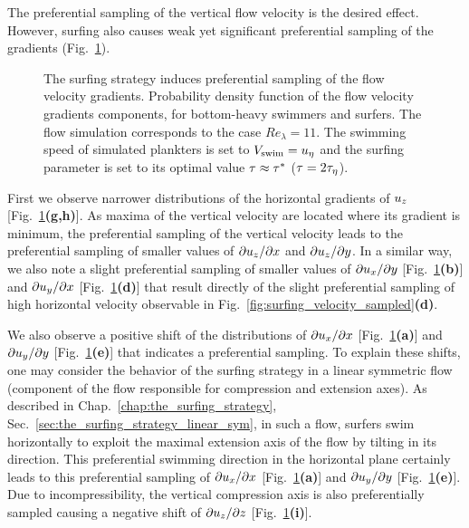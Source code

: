 The preferential sampling of the vertical flow velocity is the desired effect. 
However, surfing also causes weak yet significant preferential sampling of the gradients (Fig.~\ref{fig:surfing_gradient_sampled}).
\begin{figure}[t]
	\centering
	
	\caption[The surfing strategy induces preferential sampling of the flow velocity gradients.]{
		The surfing strategy induces preferential sampling of the flow velocity gradients.
		Probability density function of the flow velocity gradients components, for bottom-heavy swimmers and surfers. 
		The flow simulation corresponds to the case $\mathit{Re}_{\lambda} = 11$. The swimming speed of simulated plankters is set to $V_{\mathrm{swim}} = u_{\eta}$ and the surfing parameter is set to its optimal value $\tau \approx \tau^*$ ($\tau = 2 \tau_{\eta}$).
	}
	\label{fig:surfing_gradient_sampled}
\end{figure}
First we observe narrower distributions of the horizontal gradients of $u_{z}$ [Fig.~\ref{fig:surfing_gradient_sampled}\textbf{(g,h)}]. 
As maxima of the vertical velocity are located where its gradient is minimum, the preferential sampling of the vertical velocity leads to the preferential sampling of smaller values of $\partial u_z/\partial x$ and $\partial u_z/\partial y$.
In a similar way, we also note a slight preferential sampling of smaller values of $\partial u_x/\partial y$ [Fig.~\ref{fig:surfing_gradient_sampled}\textbf{(b)}] and $\partial u_y/\partial x$ [Fig.~\ref{fig:surfing_gradient_sampled}\textbf{(d)}] that result directly of the slight preferential sampling of high horizontal velocity observable in Fig.~\ref{fig:surfing_velocity_sampled}\textbf{(d)}.

We also observe a positive shift of the distributions of $\partial u_x/\partial x$ [Fig.~\ref{fig:surfing_gradient_sampled}\textbf{(a)}] and $\partial u_y/\partial y$ [Fig.~\ref{fig:surfing_gradient_sampled}\textbf{(e)}] that indicates a preferential sampling.
To explain these shifts, one may consider the behavior of the surfing strategy in a linear symmetric flow (component of the flow responsible for compression and extension axes).
As described in Chap.~\ref{chap:the_surfing_strategy}, Sec.~\ref{sec:the_surfing_strategy_linear_sym}, in such a flow, surfers swim horizontally to exploit the maximal extension axis of the flow by tilting in its direction.
This preferential swimming direction in the horizontal plane certainly leads to this preferential sampling of $\partial u_x/\partial x$ [Fig.~\ref{fig:surfing_gradient_sampled}\textbf{(a)}] and $\partial u_y/\partial y$ [Fig.~\ref{fig:surfing_gradient_sampled}\textbf{(e)}].
Due to incompressibility, the vertical compression axis is also preferentially sampled causing a negative shift of $\partial u_z/\partial z$ [Fig.~\ref{fig:surfing_gradient_sampled}\textbf{(i)}].

